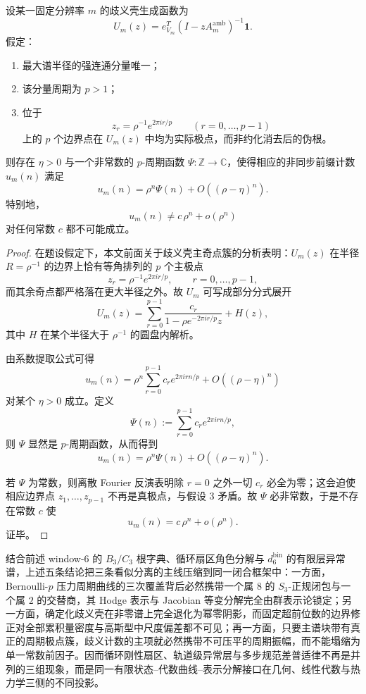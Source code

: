 \begin{theorem}[歧义壳主极点的周期振幅障碍]\label{thm:conclusion-ambiguity-shell-periodic-amplitude-obstruction}
设某一固定分辨率 \(m\) 的歧义壳生成函数为
\[
U_m(z)=e_{V_m}^{T}(I-zA_m^{\mathrm{amb}})^{-1}\mathbf 1.
\]
假定：
\begin{enumerate}
\item 最大谱半径的强连通分量唯一；
\item 该分量周期为 \(p>1\)；
\item 位于
\[
z_r=\rho^{-1}e^{2\pi i r/p}
\qquad (r=0,\dots,p-1)
\]
上的 \(p\) 个边界点在 \(U_m(z)\) 中均为实际极点，而非约化消去后的伪根。
\end{enumerate}
则存在 \(\eta>0\) 与一个非常数的 \(p\)-周期函数 \(\Psi:\mathbb Z\to\mathbb C\)，使得相应的非同步前缀计数 \(u_m(n)\) 满足
\[
u_m(n)=\rho^n\Psi(n)+O((\rho-\eta)^n).
\]
特别地，
\[
u_m(n)\neq c\,\rho^n+o(\rho^n)
\]
对任何常数 \(c\) 都不可能成立。
\end{theorem}

\begin{proof}
在题设假定下，本文前面关于歧义壳主奇点簇的分析表明：\(U_m(z)\) 在半径 \(R=\rho^{-1}\) 的边界上恰有等角排列的 \(p\) 个主极点
\[
z_r=\rho^{-1}e^{2\pi i r/p},
\qquad r=0,\dots,p-1,
\]
而其余奇点都严格落在更大半径之外。故 \(U_m\) 可写成部分分式展开
\[
U_m(z)=\sum_{r=0}^{p-1}\frac{c_r}{1-\rho e^{-2\pi i r/p}z}+H(z),
\]
其中 \(H\) 在某个半径大于 \(\rho^{-1}\) 的圆盘内解析。

由系数提取公式可得
\[
u_m(n)=\rho^n\sum_{r=0}^{p-1}c_r e^{2\pi i rn/p}+O((\rho-\eta)^n)
\]
对某个 \(\eta>0\) 成立。定义
\[
\Psi(n):=\sum_{r=0}^{p-1}c_r e^{2\pi i rn/p},
\]
则 \(\Psi\) 显然是 \(p\)-周期函数，从而得到
\[
u_m(n)=\rho^n\Psi(n)+O((\rho-\eta)^n).
\]

若 \(\Psi\) 为常数，则离散 Fourier 反演表明除 \(r=0\) 之外一切 \(c_r\) 必全为零；这会迫使相应边界点 \(z_1,\dots,z_{p-1}\) 不再是真极点，与假设 3 矛盾。故 \(\Psi\) 必非常数，于是不存在常数 \(c\) 使
\[
u_m(n)=c\,\rho^n+o(\rho^n).
\]
证毕。
\end{proof}



\noindent
结合前述 window-\(6\) 的 \(B_3/C_3\) 根字典、循环扇区角色分解与 \(d_6^{\mathrm{bin}}\) 的有限层异常谱，上述五条结论把三条看似分离的主线压缩到同一闭合框架中：一方面，Bernoulli-\(p\) 压力周期曲线的三次覆盖背后必然携带一个属 \(8\) 的 \(S_3\)-正规闭包与一个属 \(2\) 的交替商，其 Hodge 表示与 Jacobian 等变分解完全由群表示论锁定；另一方面，确定化歧义壳在非零谱上完全退化为幂零阴影，而固定超前位数的边界修正对全部累积量密度与高斯型中尺度偏差都不可见；再一方面，只要主谱块带有真正的周期极点簇，歧义计数的主项就必然携带不可压平的周期振幅，而不能塌缩为单一常数前因子。因而循环刚性扇区、轨道级异常层与多步规范差普适律不再是并列的三组现象，而是同一有限状态--代数曲线--表示分解接口在几何、线性代数与热力学三侧的不同投影。

\endinput
